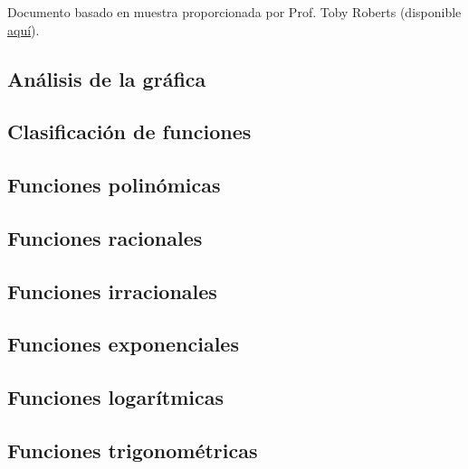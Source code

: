 Documento basado en muestra proporcionada por Prof. Toby Roberts (disponible \href{http://www.maths.adelaide.edu.au/anthony.roberts/LaTeX/Src/maths.tex}{aquí}).

\subsection{Análisis de la gráfica}


\subsection{Clasificación de funciones}


\subsection{Funciones polinómicas}


\subsection{Funciones racionales}


\subsection{Funciones irracionales}


\subsection{Funciones exponenciales}


\subsection{Funciones logarítmicas}


\subsection{Funciones trigonométricas}

